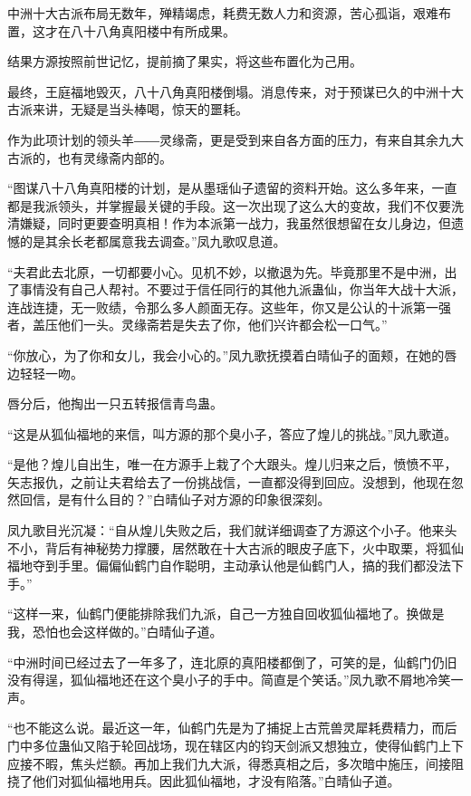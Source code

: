 \begin{this_body}
中洲十大古派布局无数年，殚精竭虑，耗费无数人力和资源，苦心孤诣，艰难布置，这才在八十八角真阳楼中有所成果。

结果方源按照前世记忆，提前摘了果实，将这些布置化为己用。

最终，王庭福地毁灭，八十八角真阳楼倒塌。消息传来，对于预谋已久的中洲十大古派来讲，无疑是当头棒喝，惊天的噩耗。

作为此项计划的领头羊――灵缘斋，更是受到来自各方面的压力，有来自其余九大古派的，也有灵缘斋内部的。

“图谋八十八角真阳楼的计划，是从墨瑶仙子遗留的资料开始。这么多年来，一直都是我派领头，并掌握最关键的手段。这一次出现了这么大的变故，我们不仅要洗清嫌疑，同时更要查明真相！作为本派第一战力，我虽然很想留在女儿身边，但遗憾的是其余长老都属意我去调查。”凤九歌叹息道。

“夫君此去北原，一切都要小心。见机不妙，以撤退为先。毕竟那里不是中洲，出了事情没有自己人帮衬。不要过于信任同行的其他九派蛊仙，你当年大战十大派，连战连捷，无一败绩，令那么多人颜面无存。这些年，你又是公认的十派第一强者，盖压他们一头。灵缘斋若是失去了你，他们兴许都会松一口气。”

“你放心，为了你和女儿，我会小心的。”凤九歌抚摸着白晴仙子的面颊，在她的唇边轻轻一吻。

唇分后，他掏出一只五转报信青鸟蛊。

“这是从狐仙福地的来信，叫方源的那个臭小子，答应了煌儿的挑战。”凤九歌道。

“是他？煌儿自出生，唯一在方源手上栽了个大跟头。煌儿归来之后，愤愤不平，矢志报仇，之前让夫君给去了一份挑战信，一直都没得到回应。没想到，他现在忽然回信，是有什么目的？”白晴仙子对方源的印象很深刻。

凤九歌目光沉凝：“自从煌儿失败之后，我们就详细调查了方源这个小子。他来头不小，背后有神秘势力撑腰，居然敢在十大古派的眼皮子底下，火中取栗，将狐仙福地夺到手里。偏偏仙鹤门自作聪明，主动承认他是仙鹤门人，搞的我们都没法下手。”

“这样一来，仙鹤门便能排除我们九派，自己一方独自回收狐仙福地了。换做是我，恐怕也会这样做的。”白晴仙子道。

“中洲时间已经过去了一年多了，连北原的真阳楼都倒了，可笑的是，仙鹤门仍旧没有得逞，狐仙福地还在这个臭小子的手中。简直是个笑话。”凤九歌不屑地冷笑一声。

“也不能这么说。最近这一年，仙鹤门先是为了捕捉上古荒兽灵犀耗费精力，而后门中多位蛊仙又陷于轮回战场，现在辖区内的钧天剑派又想独立，使得仙鹤门上下应接不暇，焦头烂额。再加上我们九大派，得悉真相之后，多次暗中施压，间接阻挠了他们对狐仙福地用兵。因此狐仙福地，才没有陷落。”白晴仙子道。


\end{this_body}

